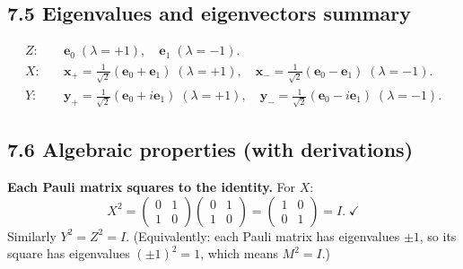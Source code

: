 \documentclass[12pt,a4paper]{article}
\begin{document}
\subsection{7.5 Eigenvalues and eigenvectors summary}
\begin{align}
    Z: &\quad \mathbf{e}_0\;(\lambda=+1),\quad \mathbf{e}_1\;(\lambda=-1). \\
    X: &\quad \mathbf{x}_+=\tfrac{1}{\sqrt{2}}(\mathbf{e}_0+\mathbf{e}_1)\;(\lambda=+1),\quad \mathbf{x}_-=\tfrac{1}{\sqrt{2}}(\mathbf{e}_0-\mathbf{e}_1)\;(\lambda=-1). \\
    Y: &\quad \mathbf{y}_+=\tfrac{1}{\sqrt{2}}(\mathbf{e}_0+i\mathbf{e}_1)\;(\lambda=+1),\quad \mathbf{y}_-=\tfrac{1}{\sqrt{2}}(\mathbf{e}_0-i\mathbf{e}_1)\;(\lambda=-1).
\end{align}

\subsection{7.6 Algebraic properties (with derivations)}

\noindent\textbf{Each Pauli matrix squares to the identity.}  For $X$:
\[
    X^2 = \begin{pmatrix}0&1\\1&0\end{pmatrix}\begin{pmatrix}0&1\\1&0\end{pmatrix}
    = \begin{pmatrix}1&0\\0&1\end{pmatrix} = I.\;\checkmark
\]
Similarly $Y^2 = Z^2 = I$.  (Equivalently: each Pauli matrix has eigenvalues $\pm 1$, so its square has eigenvalues $(\pm 1)^2 = 1$, which means $M^2 = I$.)
\end{document}
